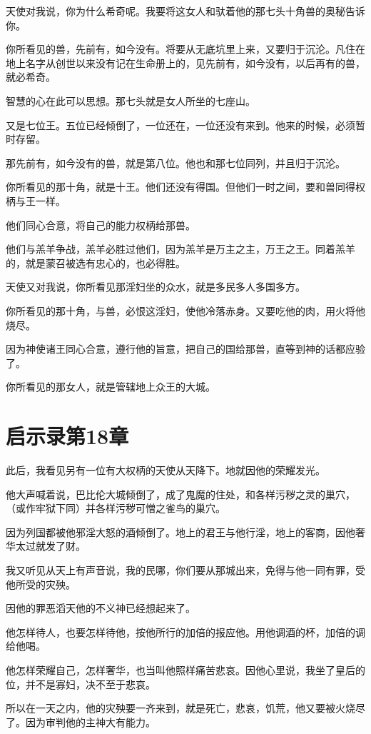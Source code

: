 \documentclass[12pt,oneside]{book}
\begin{document}
天使对我说，你为什么希奇呢。我要将这女人和驮着他的那七头十角兽的奥秘告诉你。

你所看见的兽，先前有，如今没有。将要从无底坑里上来，又要归于沉沦。凡住在地上名字从创世以来没有记在生命册上的，见先前有，如今没有，以后再有的兽，就必希奇。

智慧的心在此可以思想。那七头就是女人所坐的七座山。

又是七位王。五位已经倾倒了，一位还在，一位还没有来到。他来的时候，必须暂时存留。

那先前有，如今没有的兽，就是第八位。他也和那七位同列，并且归于沉沦。

你所看见的那十角，就是十王。他们还没有得国。但他们一时之间，要和兽同得权柄与王一样。

他们同心合意，将自己的能力权柄给那兽。

他们与羔羊争战，羔羊必胜过他们，因为羔羊是万主之主，万王之王。同着羔羊的，就是蒙召被选有忠心的，也必得胜。

天使又对我说，你所看见那淫妇坐的众水，就是多民多人多国多方。

你所看见的那十角，与兽，必恨这淫妇，使他冷落赤身。又要吃他的肉，用火将他烧尽。

因为神使诸王同心合意，遵行他的旨意，把自己的国给那兽，直等到神的话都应验了。

你所看见的那女人，就是管辖地上众王的大城。

\chapter{启示录第18章}
此后，我看见另有一位有大权柄的天使从天降下。地就因他的荣耀发光。

他大声喊着说，巴比伦大城倾倒了，成了鬼魔的住处，和各样污秽之灵的巢穴，（或作牢狱下同）并各样污秽可憎之雀鸟的巢穴。

因为列国都被他邪淫大怒的酒倾倒了。地上的君王与他行淫，地上的客商，因他奢华太过就发了财。

我又听见从天上有声音说，我的民哪，你们要从那城出来，免得与他一同有罪，受他所受的灾殃。

因他的罪恶滔天他的不义神已经想起来了。

他怎样待人，也要怎样待他，按他所行的加倍的报应他。用他调酒的杯，加倍的调给他喝。

他怎样荣耀自己，怎样奢华，也当叫他照样痛苦悲哀。因他心里说，我坐了皇后的位，并不是寡妇，决不至于悲哀。

所以在一天之内，他的灾殃要一齐来到，就是死亡，悲哀，饥荒，他又要被火烧尽了。因为审判他的主神大有能力。
\end{document}
